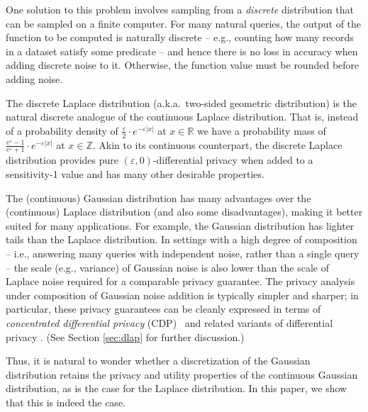 \documentclass{jpc}
\newcommand{\eps}{\varepsilon}
\newcommand{\Z}{\mathbb{Z}}
\newcommand{\R}{\mathbb{R}}
\begin{document}
One solution to this problem involves sampling from a \emph{discrete} distribution that can be sampled on a finite computer. For many natural queries, the output of the function to be computed is naturally discrete -- e.g., counting how many records in a dataset satisfy some predicate -- and hence there is no loss in accuracy when adding discrete noise to it. Otherwise, the function value must be rounded before adding noise.

The discrete Laplace distribution (a.k.a.~two-sided geometric distribution) \citep{GhoshRS12,BalcerV17} is the natural discrete analogue of the continuous Laplace distribution. That is, instead of a probability density of $\frac{\eps}{2} \cdot e^{-\eps|x|}$ at $x \in \R$ we have a probability mass of $\frac{e^\eps-1}{e^\eps+1} \cdot e^{-\eps|x|}$ at $x \in \Z$. Akin to its continuous counterpart, the discrete Laplace distribution provides pure $(\eps,0)$-differential privacy when added to a sensitivity-1 value and has many other desirable properties. 

The (continuous) Gaussian distribution has many advantages over the (continuous) Laplace distribution (and also some disadvantages), making it better suited for many applications. For example, the Gaussian distribution has lighter tails than the Laplace distribution. In settings with a high degree of composition -- i.e., answering many queries with independent noise, rather than a single query -- the scale (e.g., variance) of Gaussian noise is also lower than the scale of Laplace noise required for a comparable privacy guarantee. The privacy analysis under composition of Gaussian noise addition is typically simpler and sharper; in particular, these privacy guarantees can be cleanly expressed in terms of \emph{concentrated differential privacy} (CDP)~\citep{DworkR16,BunS16} and related variants of differential privacy \citep{Mironov17,BunDRS18,DongRS19}. (See Section \ref{sec:dlap} for further discussion.)

Thus, it is natural to wonder whether a discretization of the Gaussian distribution retains the privacy and utility properties of the continuous Gaussian distribution, as is the case for the Laplace distribution. 
In this paper, we show that this is indeed the case. 
\end{document}
